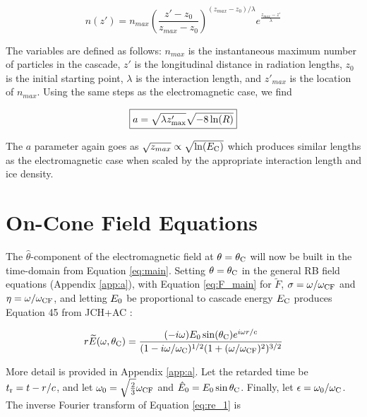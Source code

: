 \documentclass[amsmath,amssymb,aps,prd,10pt,twocolumn]{revtex4}
\begin{document}
\begin{equation}
n(z') = n_{max} \left( \frac{z'-z_{0}}{z_{max} - z_{0}} \right)^{(z_{max} - z_{0})/\lambda} e^{ \frac{z_{max} - z'}{\lambda}}
\end{equation}

The variables are defined as follows: $n_{max}$ is the instantaneous maximum number of particles in the cascade, $z'$ is the longitudinal distance in radiation lengths, $z_0$ is the initial starting point, $\lambda$ is the interaction length, and $z'_{max}$ is the location of $n_{max}$.  Using the same steps as the electromagnetic case, we find

\begin{equation}
\boxed{
a = \sqrt{\lambda z'_{\rm max}} \sqrt{-8 \ln(R)}
} \label{eq:main_2}
\end{equation}

The $a$ parameter again goes as $\sqrt{z_{max}} \propto \sqrt{\ln(E_{\rm C})}$ which produces similar lengths as the electromagnetic case when scaled by the appropriate interaction length and ice density.

\section{On-Cone Field Equations}
\label{sec:onc}

The $\hat{\theta}$-component of the electromagnetic field at $\theta = \theta_{\rm C}$ will now be built in the time-domain from Equation \ref{eq:main}.  Setting $\theta = \theta_{\rm C}$ in the general RB field equations (Appendix \ref{app:a}), with Equation \ref{eq:F_main} for $\widetilde{F}$, $\sigma = \omega/\omega_{\rm CF}$ and $\eta = \omega/\omega_{\rm CF}$, and letting $E_{\rm 0}$ be proportional to cascade energy $E_{\rm C}$ produces Equation 45 from JCH+AC \cite{10.1016/j.astropartphys.2017.03.008}:

\begin{equation}
r\widetilde{E}(\omega,\theta_{\rm C}) = \frac{(-i\omega) E_0 \sin(\theta_{\rm C}) e^{i\omega r/c}}{(1-i \omega/\omega_{\rm C})^{1/2} (1+(\omega/\omega_{\rm CF})^2)^{3/2}} \label{eq:re_1}
\end{equation}

More detail is provided in Appendix \ref{app:a}. Let the retarded time be $t_{\rm r} = t - r/c$, and let $\omega_0 = \sqrt{\frac{2}{3	}}\omega_{\rm CF}$ and $\hat{E}_{\rm 0} = E_{\rm 0} \sin\theta_{\rm C}$.  Finally, let $\epsilon = \omega_0/\omega_{\rm C}$.  The inverse Fourier transform of Equation \ref{eq:re_1} is
\end{document}
